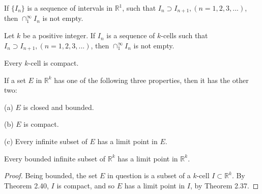 \begin{thm}
    \label{thm:2.38}
    If $\{I_n\}$ is a sequence of intervals in $\mathbb{R}^1$, such that $I_n \supset I_{n+1}, (n=1,2,3,...)$, then $\cap_1^\infty I_n$ is not empty.
\end{thm}

\begin{thm}
    \label{thm:2.39}
    Let $k$ be a positive integer. If ${I_n}$ is a sequence of $k$-cells such that $I_n \supset I_{n+1}, (n=1,2,3,...)$, then $\cap_1^\infty I_n$ is not empty.
\end{thm}

\begin{thm}
    \label{thm:2.40}
    Every $k$-cell is compact.
\end{thm}

\begin{thm}
    \label{thm:2.41}
    If a set $E$ in $\mathbb{R}^k$ has one of the following three properties, then it has the other two:

(a) $E$ is closed and bounded.

(b) $E$ is compact.

(c) Every infinite subset of $E$ has a limit point in $E$.
\end{thm}

\begin{thm}
    \label{thm:2.42 Weierstrass}
    Every bounded infinite subset of $\mathbb{R}^k$ has a limit point in $\mathbb{R}^k$.
\end{thm}

\begin{proof}
    Being bounded, the set $E$ in question is a subset of a $k$-cell $I\subset \mathbb{R}^k$.
    By Theorem 2.40, $I$ is compact, 
    and so $E$ has a limit point in $I$, by Theorem 2.37.
\end{proof}